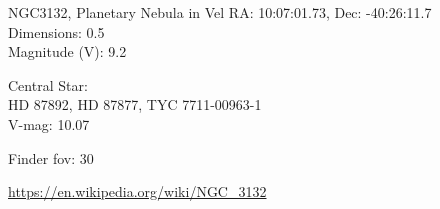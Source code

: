 \begin{block}{NGC3132, Planetary Nebula in Vel}
    RA: 10:07:01.73, Dec: -40:26:11.7 \\ 
    Dimensions: 0.5 \\ 
    Magnitude (V): 9.2

    Central Star: \\ 
      \hspace{1em}HD 87892, HD 87877, TYC 7711-00963-1 \\ 
      \hspace{1em}V-mag: 10.07 


    Finder fov: 30 

    \url{https://en.wikipedia.org/wiki/NGC_3132} 
\end{block}